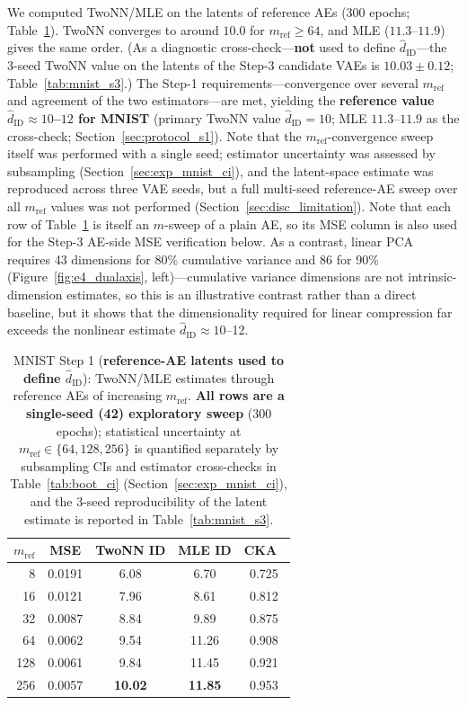 \documentclass[make,article,submit,pdftex,moreauthors]{Definitions/mdpi}
\newcommand{\hatdID}{\hat{d}_{\mathrm{ID}}}
\begin{document}
We computed TwoNN/MLE on the latents of reference AEs (300 epochs;
Table~\ref{tab:mnist_s1}).
TwoNN converges to around $10.0$ for $m_{\mathrm{ref}} \geq 64$, and MLE
($11.3$--$11.9$) gives the same order.
(As a diagnostic cross-check---\textbf{not} used to define $\hatdID$---the
3-seed TwoNN value on the latents of the Step-3 candidate VAEs is
$10.03 \pm 0.12$; Table~\ref{tab:mnist_s3}.)
The Step-1 requirements---convergence over several $m_{\mathrm{ref}}$ and
agreement of the two estimators---are met, yielding the
\textbf{reference value $\hatdID \approx 10$--$12$ for MNIST}
(primary TwoNN value $\hatdID = 10$; MLE $11.3$--$11.9$ as the
cross-check; Section~\ref{sec:protocol_s1}).
Note that the $m_{\mathrm{ref}}$-convergence sweep itself was performed
with a single seed; estimator uncertainty was assessed by subsampling
(Section~\ref{sec:exp_mnist_ci}), and the latent-space estimate was
reproduced across three VAE seeds, but a full multi-seed reference-AE sweep
over all $m_{\mathrm{ref}}$ values was not performed
(Section~\ref{sec:disc_limitation}).
Note that each row of Table~\ref{tab:mnist_s1} is itself an $m$-sweep of a
plain AE, so its MSE column is also used for the Step-3 AE-side MSE
verification below.
As a contrast, linear PCA requires 43 dimensions for 80\% cumulative
variance and 86 for 90\% (Figure~\ref{fig:e4_dualaxis}, left)---cumulative
variance dimensions are not intrinsic-dimension estimates, so this is an
illustrative contrast rather than a direct baseline, but it shows that the
dimensionality required for linear compression far exceeds the nonlinear
estimate $\hatdID \approx 10$--12.

\begin{table}[H]
\caption{MNIST Step 1 (\textbf{reference-AE latents used to define
$\hatdID$}): TwoNN/MLE estimates through reference AEs of
increasing $m_{\mathrm{ref}}$. \textbf{All rows are a single-seed (42)
exploratory sweep} (300 epochs); statistical uncertainty at
$m_{\mathrm{ref}} \in \{64, 128, 256\}$ is quantified separately by
subsampling CIs and estimator cross-checks in Table~\ref{tab:boot_ci}
(Section~\ref{sec:exp_mnist_ci}), and the 3-seed reproducibility of the
latent estimate is reported in Table~\ref{tab:mnist_s3}.}
\label{tab:mnist_s1}
\small
\begin{tabular}{rcccc}
\toprule
$m_{\mathrm{ref}}$ & \textbf{MSE} & \textbf{TwoNN ID} & \textbf{MLE ID} & \textbf{CKA}~\cite{kornblith2019cka} \\
\midrule
8   & 0.0191 & 6.08 & 6.70 & 0.725 \\
16  & 0.0121 & 7.96 & 8.61 & 0.812 \\
32  & 0.0087 & 8.84 & 9.89 & 0.875 \\
64  & 0.0062 & 9.54 & 11.26 & 0.908 \\
128 & 0.0061 & 9.84 & 11.45 & 0.921 \\
256 & 0.0057 & \textbf{10.02} & \textbf{11.85} & 0.953 \\
\bottomrule
\end{tabular}
\end{table}
\end{document}
